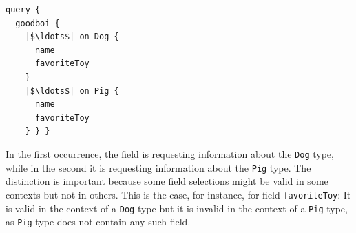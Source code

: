 \begin{verbatim}
query {
  goodboi {
    |$\ldots$| on Dog {
      name
      favoriteToy
    }
    |$\ldots$| on Pig {
      name
      favoriteToy
    } } }
\end{verbatim}



\noindent In the first occurrence, the field is requesting information about the
\texttt{Dog} type, while in the second it is requesting information about the \texttt{Pig} type. The distinction is important because some field selections might be valid in some contexts but not in others. This is the case, for instance, for field \texttt{favoriteToy}: It is valid in the context of a \texttt{Dog} type but it is invalid in the context of a \texttt{Pig} type, as \texttt{Pig} type does not contain any such field. %



